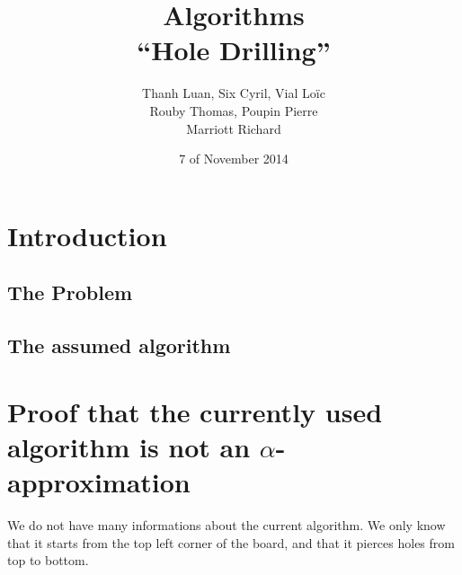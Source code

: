 \documentclass[11pt]{article}
\title{Algorithms \\
	\textbf{``Hole Drilling''}}
\author{Thanh Luan, Six Cyril, Vial Loïc \\
			Rouby Thomas, Poupin Pierre\\
			Marriott Richard}
\date{7\up{th} of November 2014}
\begin{document}
\maketitle
\tableofcontents

\section{Introduction}
\subsection{The Problem}

\subsection{The assumed algorithm}



\newcommand{\notalphagraph}[1] {
	\begin{tikzpicture}[scale=0.85]
			\def\n{#1}
			\def\height{5}
			\def\width{5}
			\foreach \x in {0,\width} {
				\foreach \y in {0,...,\n} {
					\draw [fill] ($(\x,\y*\height/\n)$) circle [radius=0.1];
					\draw [red,middlearrow={latex},thick] ($(0,\y*\height/\n)$) -- ($(\width,\y*\height/\n)$);
					\ifnum \y > 0 {
						\draw [red,middlearrow={latex},thick] ($(\width,\y*\height/\n)$) -- ($(0,\y*\height/\n - \height/\n)$);
					} \else
					\fi
				}
			}
			\draw [blue,middlearrow={latex},thick] (0,\height) -- (0,0);
			\draw [blue,middlearrow={latex},thick] (0,0) -- (\width,0);
			\draw [blue,middlearrow={latex},thick] (\width,0) -- (\width,\height);
		\end{tikzpicture}
}

\newcommand{\notAlphaGraphOnlyRed}[1] {
	\begin{tikzpicture}[scale=0.85]
			\def\n{#1}
			\def\height{5}
			\def\width{5}
			\foreach \x in {0,\width} {
				\foreach \y in {0,...,\n} {
					\draw [fill] ($(\x,\y*\height/\n)$) circle [radius=0.1];
					\draw [red,middlearrow={latex},thick] ($(0,\y*\height/\n)$) -- ($(\width,\y*\height/\n)$);
					\ifnum \y > 0 {
						\draw [red,middlearrow={latex},thick] ($(\width,\y*\height/\n)$) -- ($(0,\y*\height/\n - \height/\n)$);
					} \else
					\fi
				}
			}
		\end{tikzpicture}
}

\section{Proof that the currently used algorithm is not an $\alpha$-approximation}
We do not have many informations about the current algorithm. We only know that it starts from the top left corner of the board, and that
it pierces holes from top to bottom.
\end{document}
